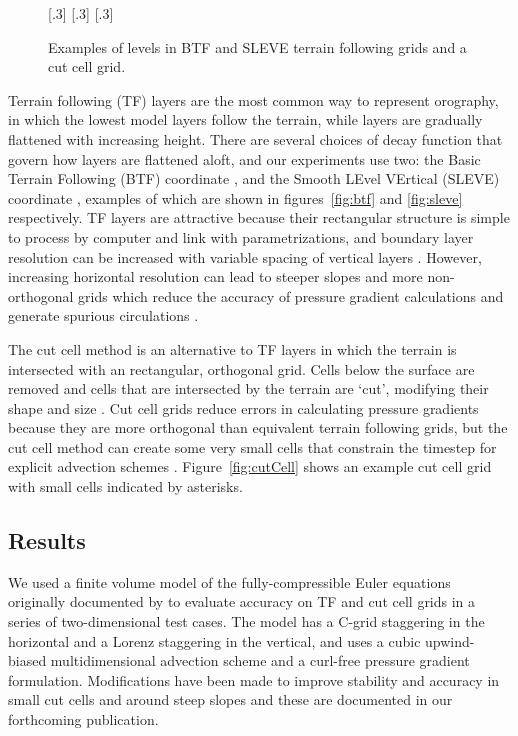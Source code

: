\documentclass[a4paper]{article}
\begin{document}
\begin{figure}
	\centering
	[.3\linewidth]{}
	[.3\linewidth]{}
	[.3\linewidth]{}
%
	\caption{Examples of levels in BTF and SLEVE terrain following grids and a cut cell grid.}
	\label{fig:grids}
\end{figure}

Terrain following (TF) layers are the most common way to represent orography, in which the lowest model layers follow the terrain, while layers are gradually flattened with increasing height.  There are several choices of decay function that govern how layers are flattened aloft, and our experiments use two: the Basic Terrain Following (BTF) coordinate \citep{galchen-somerville1975}, and the Smooth LEvel VErtical (SLEVE) coordinate \citep{schaer2002}, examples of which are shown in figures~\ref{fig:btf} and \ref{fig:sleve} respectively.  TF layers are attractive because their rectangular structure is simple to process by computer and link with parametrizations, and boundary layer resolution can be increased with variable spacing of vertical layers \citep{schaer2002}.
However, increasing horizontal resolution can lead to steeper slopes and more non-orthogonal grids which reduce the accuracy of pressure gradient calculations and generate spurious circulations \citep{dempsey-davis1998,klemp2011}.

The cut cell method is an alternative to TF layers in which the terrain is intersected with an rectangular, orthogonal grid.  Cells below the surface are removed and cells that are intersected by the terrain are `cut', modifying their shape and size \citep{adcroft1997}.  Cut cell grids reduce errors in calculating pressure gradients because they are more orthogonal than equivalent terrain following grids, but the cut cell method can create some very small cells that constrain the timestep for explicit advection schemes \citep{klein2009}.  Figure~\ref{fig:cutCell} shows an example cut cell grid with small cells indicated by asterisks.

\subsection{Results}
We used a finite volume model of the fully-compressible Euler equations originally documented by \citet{weller-shahrokhi2014} to evaluate accuracy on TF and cut cell grids in a series of two-dimensional test cases.  The model has a C-grid staggering in the horizontal and a Lorenz staggering in the vertical, and uses a cubic upwind-biased multidimensional advection scheme and a curl-free pressure gradient formulation.  Modifications have been made to improve stability and accuracy in small cut cells and around steep slopes and these are documented in our forthcoming publication.
\end{document}

